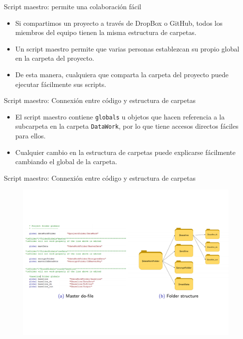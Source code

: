 \documentclass[11pt, aspectratio=169, compress]{beamer}
\begin{document}
\begin{frame}{Script maestro: permite una colaboración fácil}
	\begin{itemize}
		\item Si compartimos un proyecto a través de DropBox o GitHub, todos los miembros del equipo tienen la misma estructura de carpetas.
		\item Un script maestro permite que varias personas establezcan su propio global en la carpeta del proyecto.
		\item De esta manera, cualquiera que comparta la carpeta del proyecto puede ejecutar fácilmente sus scripts.
	\end{itemize}
\end{frame}
\begin{frame}{Script maestro: Connexión entre código y estructura de carpetas}
	\begin{itemize}
		\item El script maestro contiene \texttt{globals} u objetos que hacen referencia a la subcarpeta en la carpeta \texttt{DataWork}, por lo que tiene accesos directos fáciles para ellos.
		\item Cualquier cambio en la estructura de carpetas puede explicarse fácilmente cambiando el global de la carpeta.
	\end{itemize}
\end{frame}
\begin{frame}{Script maestro: Connexión entre código y estructura de carpetas}
	\begin{figure}[H]
		\centering
		\includegraphics[width=1\textwidth]{code_structure.pdf}
	\end{figure}
\end{frame}
\end{document}
